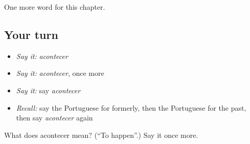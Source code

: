 \begin{grammarlens}[title={What you've built}]
One more word for this chapter.
\end{grammarlens}

\subsection*{Your turn}
\begin{itemize}
\raggedright
  \item \emph{Say it:} \emph{acontecer}
  \item \emph{Say it:} \emph{acontecer}, once more
  \item \emph{Say it:} say \emph{acontecer}
  \item \emph{Recall:} say the Portuguese for formerly, then the Portuguese for the past, then say \emph{acontecer} again
\end{itemize}

\begin{tcolorbox}[breakable,colback=teal!4,colframe=teal!35!black,title={Before you move on}]
What does acontecer mean? (\textquotedblleft{}To happen\textquotedblright{}.) Say it once more.
\end{tcolorbox}
